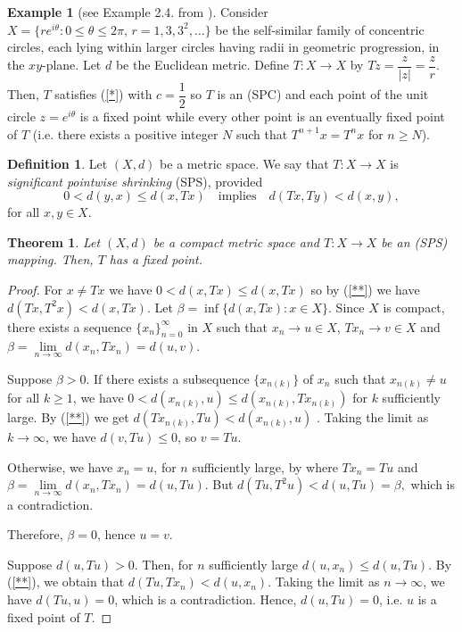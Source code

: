 \documentclass[12 pt]{article}
\theoremstyle{lema}
\theoremstyle{proposition}
\theoremstyle{theorem}
\newtheorem{theorem}{Theorem}[section]
\theoremstyle{theorem}
\theoremstyle{corollary}
\theoremstyle{definition}
\newtheorem{definition}{Definition}[section]
\theoremstyle{example}
\newtheorem{example}{Example}[section]
\begin{document}
	\begin{example}[see Example 2.4. from \cite{Pant}]
		Consider $X = \{re^{i\theta} : 0 \leq \theta \leq 2\pi,\, r = 1,3,3^2,\dots\}$ be the self-similar family of concentric circles, each lying within larger circles having radii in geometric progression, in the \(xy\)-plane. Let \(d\) be the Euclidean metric. Define \(T:X \to X\) by \(Tz=\dfrac{z}{|z|}=\dfrac{z}{r}\). Then, \(T\) satisfies (\ref{*}) with \(c= \dfrac{1}{2}\) so $T$ is an (SPC) and each point of the unit circle \(z=e^{i\theta}\) is a fixed point while every other point is an eventually fixed point of \(T\) (i.e. there exists a positive integer \(N\) such that \(T^{n+1}x=T^nx\) for \(n\geq N\)).
	\end{example}

	\begin{definition}
		Let \((X,d)\) be a metric space. We say that \(T : X \to X \) is \textit{significant pointwise shrinking} (SPS), provided 
		\begin{equation}
			0<d(y,x)\leq d(x,Tx) \quad \text{implies} \quad d(Tx,Ty) < d(x,y),
			\label{**}
		\end{equation}
		for all \(x,y \in X\).
	\end{definition}

	\begin{theorem} 	
		Let \((X,d)\) be a compact metric space and \(T : X \to X \) be an (SPS) mapping. Then, \(T\) has a fixed point.
	\end{theorem}

	\begin{proof}
		For \(x\neq Tx\) we have \(0<d(x,Tx)\leq d(x,Tx)\) so by (\ref{**}) we have \(d(Tx,T^2x) < d(x,Tx)\). Let \(\beta = \inf \{d(x,Tx): x \in X\}.\)
		Since \(X\) is compact, there exists a sequence \(\{x_n\}_{n=0}^{\infty}\) in \(X\) such that \(x_n \to u \in X\), \(Tx_n \to v \in X\) and \(\beta = \lim\limits_{n\to \infty} d(x_n,Tx_n) = d (u,v)\). 
		
		Suppose \(\beta > 0\). If there exists a subsequence \(\{x_{n(k)}\}\) of \({x_n}\) such that \(x_{n(k)}\neq u\) for all \(k \geq 1\), we have \(0<d(x_{n(k)},u) \leq d(x_{n(k)},Tx_{n(k)})\) for \(k\) sufficiently large. By (\ref{**}) we get \(d(Tx_{n(k)}, Tu) < d(x_{n(k)},u)\)  . Taking the limit as \(k \to \infty\), we have \(d(v,Tu) \leq 0\), so \(v=Tu\). %
		
		Otherwise, we have \(x_n=u\), for \(n\) sufficiently large, by where \(Tx_n = Tu\) and \(\beta = \lim\limits_{n\to \infty} d(x_n,Tx_n) = d (u,Tu)\). But \(d(Tu,T^2u) < d(u,Tu) = \beta,\) which is a contradiction.
		
		Therefore, \(\beta = 0\), hence \(u=v\). 
		
		Suppose \(d(u,Tu) > 0\). Then, for \(n\) sufficiently large \(d(u,x_n) \leq d(u,Tu)\). By (\ref{**}), we obtain that \(d(Tu,Tx_n) < d(u,x_n)\). Taking the limit as \(n \to \infty\), we have \(d(Tu,u) = 0\), which is a contradiction. Hence, \(d(u,Tu)=0\), i.e. \(u\) is a fixed point of \(T\).
	\end{proof}
\end{document}

